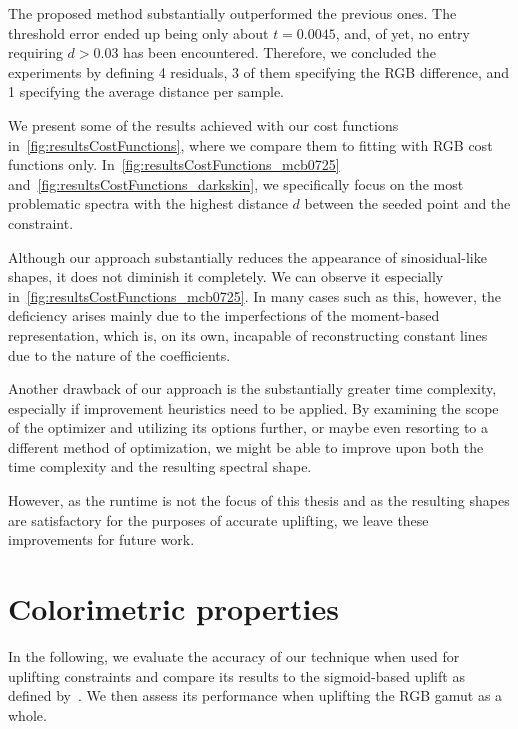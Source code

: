 The proposed method substantially outperformed the previous ones. The threshold error ended up being only about $t = 0.0045$, and, of yet, no entry requiring $d > 0.03$ has been encountered. Therefore, we concluded the experiments by defining 4 residuals, 3 of them specifying the RGB difference, and 1 specifying the average distance per sample.

We present some of the results achieved with our cost functions in~\cref{fig:resultsCostFunctions}, where we compare them to fitting with RGB cost functions only. In~\cref{fig:resultsCostFunctions_mcb0725} and~\cref{fig:resultsCostFunctions_darkskin}, we specifically focus on the most problematic spectra with the highest distance $d$ between the seeded point and the constraint.

Although our approach substantially reduces the appearance of sinosidual-like shapes, it does not diminish it completely. We can observe it especially in~\cref{fig:resultsCostFunctions_mcb0725}. In many cases such as this, however, the deficiency arises mainly due to the imperfections of the moment-based representation, which is, on its own, incapable of reconstructing constant lines due to the nature of the coefficients.

Another drawback of our approach is the substantially greater time complexity, especially if improvement heuristics need to be applied. By examining the scope of the optimizer and utilizing its options further, or maybe even resorting to a different method of optimization, we might be able to improve upon both the time complexity and the resulting spectral shape.

However, as the runtime is not the focus of this thesis and as the resulting shapes are satisfactory for the purposes of accurate uplifting, we leave these improvements for future work.

\section{Colorimetric properties}

In the following, we evaluate the accuracy of our technique when used for uplifting constraints and compare its results to the sigmoid-based uplift as defined by~\citet{upsamplingJakobHanika}. We then assess its performance when uplifting the RGB gamut as a whole.


